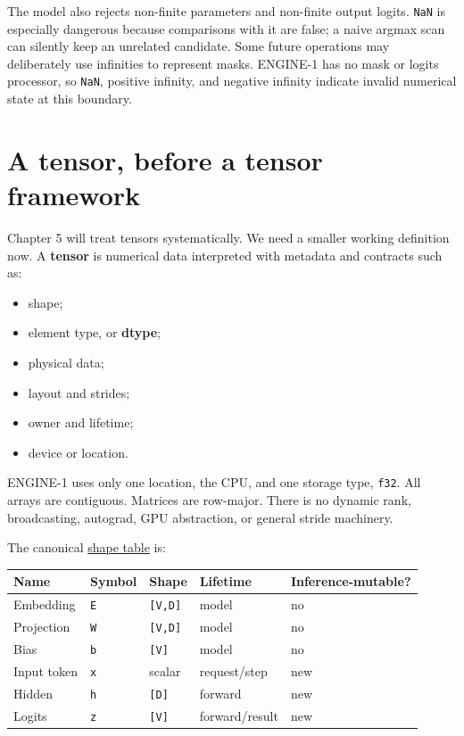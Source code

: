The model also rejects non-finite parameters and non-finite output
logits. \texttt{NaN} is especially dangerous because comparisons with it
are false; a naive argmax scan can silently keep an unrelated candidate.
Some future operations may deliberately use infinities to represent
masks. ENGINE-1 has no mask or logits processor, so \texttt{NaN},
positive infinity, and negative infinity indicate invalid numerical
state at this boundary.

\section{A tensor, before a tensor
framework}\label{a-tensor-before-a-tensor-framework}

Chapter 5 will treat tensors systematically. We need a smaller working
definition now. A \textbf{tensor} is numerical data interpreted with
metadata and contracts such as:

\begin{itemize}
\tightlist
\item
  shape;
\item
  element type, or \textbf{dtype};
\item
  physical data;
\item
  layout and strides;
\item
  owner and lifetime;
\item
  device or location.
\end{itemize}

ENGINE-1 uses only one location, the CPU, and one storage type,
\texttt{f32}. All arrays are contiguous. Matrices are row-major. There
is no dynamic rank, broadcasting, autograd, GPU abstraction, or general
stride machinery.

The canonical
\href{https://github.com/hermonai/inside-the-llm-engine/blob/astra-visual-rewrite/diagrams/model/tiny-model-tensor-shapes.txt}{shape
table} is:

{\def\LTcaptype{none} %
\begin{longtable}[]{@{}lllll@{}}
\toprule\noalign{}
Name & Symbol & Shape & Lifetime & Inference-mutable? \\
\midrule\noalign{}
\endhead
\bottomrule\noalign{}
\endlastfoot
Embedding & \texttt{E} & \texttt{{[}V,D{]}} & model & no \\
Projection & \texttt{W} & \texttt{{[}V,D{]}} & model & no \\
Bias & \texttt{b} & \texttt{{[}V{]}} & model & no \\
Input token & \texttt{x} & scalar & request/step & new \\
Hidden & \texttt{h} & \texttt{{[}D{]}} & forward & new \\
Logits & \texttt{z} & \texttt{{[}V{]}} & forward/result & new \\
\end{longtable}
}

